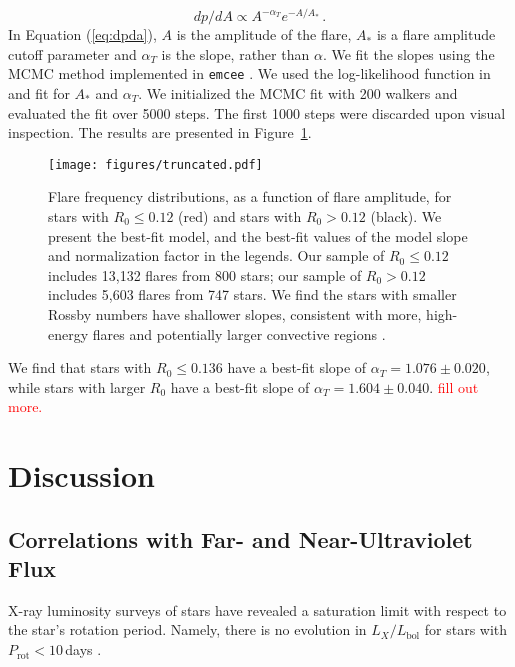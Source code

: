 \documentclass[twocolumn]{aastex631}
\begin{document}
\begin{equation}\label{eq:dpda}
  dp/dA \propto A^{-\alpha_T} e^{-A/A_*}\,.
\end{equation}
In Equation (\ref{eq:dpda}),  $A$ is the amplitude of the flare, $A_*$ is a flare amplitude cutoff parameter and $\alpha_T$ is the slope, rather than $\alpha$. We fit the slopes using the MCMC method implemented in \texttt{emcee} \citep{goodman10, emcee}. We used the log-likelihood function in \cite{seligman22} and  fit for $A_*$ and $\alpha_T$. We initialized the MCMC fit with 200 walkers and evaluated the fit over 5000 steps. The first 1000 steps were discarded upon visual inspection. The results are presented in Figure~\ref{fig:truncated}.

\begin{figure}[ht!]
    \begin{centering}
        \texttt{[image: figures/truncated.pdf]}
        \caption{
            Flare frequency distributions, as a function of flare amplitude, for stars with $R_0 \leq 0.12$ (red) and stars with $R_0 > 0.12$ (black). We present the best-fit model, and the best-fit values of the model slope and normalization factor in the legends. Our sample of $R_0 \leq 0.12$ includes 13,132 flares from 800 stars; our sample of $R_0 > 0.12$ includes 5,603 flares from 747 stars. We find the stars with smaller Rossby numbers have shallower slopes, consistent with more, high-energy flares and potentially larger convective regions \citep{seligman22}.
        }
        \label{fig:truncated}
    \end{centering}
\end{figure}


We find that stars with $R_0 \leq 0.136$ have a best-fit slope of $\alpha_T = 1.076 \pm 0.020$, while stars with larger $R_0$ have a best-fit slope of $\alpha_T = 1.604 \pm 0.040$. \textcolor{red}{fill out more.}



\section{Discussion}\label{sec:discuss}


\subsection{Correlations with Far- and Near-Ultraviolet Flux}

X-ray luminosity surveys of stars have revealed a saturation limit with respect to
the star's rotation period. Namely, there is no evolution in $L_X/L_\textrm{bol}$ for
stars with $P_\textrm{rot} < 10$\,days \citep{Pizzolato03}.
\end{document}
